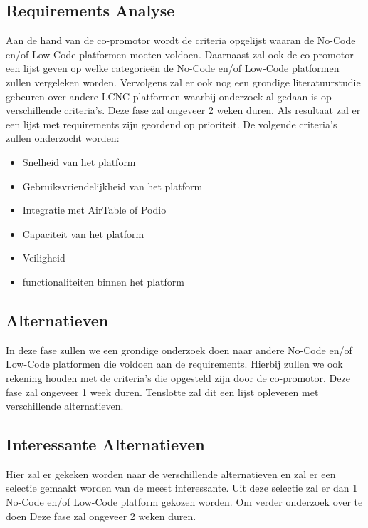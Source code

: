 \subsection*{Requirements Analyse}
\label{sub:requirements-analyse}
Aan de hand van de co-promotor wordt de criteria opgelijst waaran de No-Code en/of Low-Code platformen moeten voldoen.
Daarnaast zal ook de co-promotor een lijst geven op welke categorieën de No-Code en/of Low-Code platformen zullen vergeleken worden. 
Vervolgens zal er ook nog een grondige literatuurstudie gebeuren over andere LCNC platformen waarbij onderzoek al gedaan is op verschillende
criteria's. Deze fase zal ongeveer 2 weken duren. Als resultaat zal er een lijst met requirements zijn geordend op prioriteit.
De volgende criteria's zullen onderzocht worden:
\begin{itemize}
  \item Snelheid van het platform
  \item Gebruiksvriendelijkheid van het platform
  \item Integratie met AirTable of Podio
  \item Capaciteit van het platform
  \item Veiligheid
  \item functionaliteiten binnen het platform
\end{itemize}

\subsection*{Alternatieven}
\label{sub:alternatieven}
In deze fase zullen we een grondige onderzoek doen naar andere No-Code en/of Low-Code platformen die voldoen aan de requirements.
Hierbij zullen we ook rekening houden met de criteria's die opgesteld zijn door de co-promotor. Deze fase zal ongeveer 1 week duren. Tenslotte 
zal dit een lijst opleveren met verschillende alternatieven.

\subsection*{Interessante Alternatieven}
\label{sub:interessante-alternatieven}
Hier zal er gekeken worden naar de verschillende alternatieven en zal er een selectie gemaakt worden van de meest interessante.
Uit deze selectie zal er dan 1 No-Code en/of Low-Code platform gekozen worden. Om verder onderzoek over te doen
Deze fase zal ongeveer 2 weken duren.

